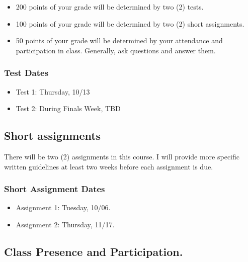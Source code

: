 \documentclass[11pt,]{article}
\providecommand{\tightlist}{%
  \setlength{\itemsep}{0pt}\setlength{\parskip}{0pt}}
\begin{document}
\begin{itemize}
\tightlist
\item
  200 points of your grade will be determined by two (2) tests.
\item
  100 points of your grade will be determined by two (2) short
  assignments.
\item
  50 points of your grade will be determined by your attendance and
  participation in class. Generally, ask questions and answer them.
\end{itemize}

\hypertarget{test-dates-1}{%
\subsubsection{Test Dates}\label{test-dates-1}}

\begin{itemize}
\item
  Test 1: Thursday, 10/13
\item
  Test 2: During Finals Week, TBD
\end{itemize}

\hypertarget{short-assignments-1}{%
\subsection{Short assignments}\label{short-assignments-1}}

There will be two (2) assignments in this course. I will provide more
specific written guidelines at least two weeks before each assignment is
due.

\hypertarget{short-assignment-dates}{%
\subsubsection{Short Assignment Dates}\label{short-assignment-dates}}

\begin{itemize}
\item
  Assignment 1: Tuesday, 10/06.
\item
  Assignment 2: Thursday, 11/17.
\end{itemize}

\hypertarget{class-presence-and-participation.}{%
\subsection{Class Presence and
Participation.}\label{class-presence-and-participation.}}
\end{document}

